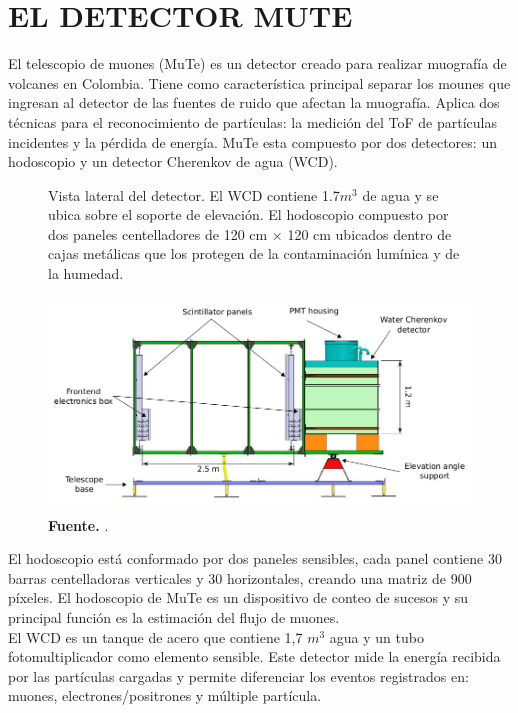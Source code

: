 \chapter{ \MakeUppercase{El Detector MuTe}}
El telescopio de muones (MuTe) es un detector creado para realizar muografía de volcanes en Colombia. Tiene como característica principal separar los mounes que ingresan al detector de las fuentes de ruido que afectan la muografía. Aplica dos técnicas para el reconocimiento de partículas: la medición del ToF de partículas incidentes y la pérdida de energía.
MuTe esta compuesto por dos detectores: un hodoscopio y un detector Cherenkov de agua (WCD).\\

\begin{figure}[h!]
\begin{center}
\caption{Vista lateral del detector. El WCD contiene 1.7$m^3$ de agua y se ubica sobre el soporte de elevación. El hodoscopio compuesto por dos paneles centelladores de
120 cm × 120 cm ubicados dentro de cajas metálicas que los protegen de la contaminación lumínica y de la humedad.}
\includegraphics[width=1 \textwidth]{Figures/imagenes/26.png}
\caption*{\textbf{Fuente.} \cite{jesusP}. }
\label{detectores}
\end{center}
\end{figure}


El hodoscopio está conformado por dos paneles sensibles, cada panel contiene 30 barras centelladoras verticales y 30 horizontales, creando una matriz de 900 píxeles. El hodoscopio de MuTe es un dispositivo de conteo de sucesos y su principal función es la estimación del flujo de muones.\\

El WCD es un tanque de acero que contiene 1,7 $m^3$ agua y un tubo fotomultiplicador como elemento sensible. Este detector mide la energía recibida por las partículas cargadas y permite diferenciar los eventos registrados en: muones, electrones/positrones y múltiple partícula.\\

